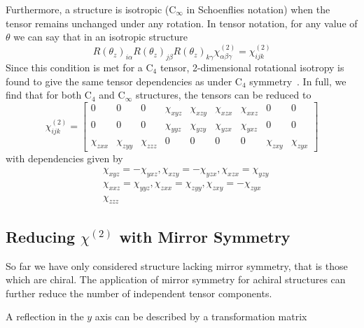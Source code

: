 Furthermore, a structure is isotropic (C$_{\infty}$ in Schoenflies notation) when the tensor remains unchanged under any rotation. In tensor notation, for any value of $\theta$ we can say that in an isotropic structure
\begin{equation}\label{eq:background:NonlinearOptics:rotation:RotIsoTensor}
	R(\theta_{z})_{i\alpha}R(\theta_{z})_{j\beta}R(\theta_{z})_{k\gamma}\chi^{(2)}_{\alpha \beta \gamma}
	=\chi^{(2)}_{ijk}
\end{equation}
Since this condition is met for a  C$_4$ tensor, 2-dimensional rotational isotropy is found to give the same tensor dependencies as under C$_4$ symmetry~\cite[\S E.1.8]{Popov1995}. In full, we find that for both C$_4$ and C$_{\infty}$ structures, the tensors can be reduced to
\begin{equation}\label{eq:background:NonlinearOptics:rotation:IsotropicChi}
	\chi^{(2)}_{ijk} =
	\begin{bmatrix}
		0 & 0 & 0 & \chi_{xyz} & \chi_{xzy} & \chi_{xzx} & \chi_{xxz} & 0 & 0\\ 
		0 & 0 & 0 & \chi_{yyz} & \chi_{yzy} & \chi_{yzx} & \chi_{yxz} & 0 & 0\\ 
		\chi_{zxx} & \chi_{zyy} & \chi_{zzz} & 0 & 0 & 0 & 0 & \chi_{zxy} & \chi_{zyx}
	\end{bmatrix}
\end{equation}
with dependencies given by
\begin{equation}\label{eq:background:NonlinearOptics:rotation:IsotropicDependancies}
\begin{split}
	&\chi_{xyz} = -\chi_{yxz}, \chi_{xzy} = -\chi_{yzx}, \chi_{xzx} = \chi_{yzy} \\
	&\chi_{xxz} = \chi_{yyz}, \chi_{zxx} = \chi_{zyy}, \chi_{zxy} = -\chi_{zyx} \\
	&\chi_{zzz}
\end{split}
\end{equation}



\subsection{Reducing \texorpdfstring{$\chi^{(2)}$}{Lg} with Mirror Symmetry}\label{sec:background:NonlinearOptics:mirror}
So far we have only considered structure lacking mirror symmetry, that is those which are chiral. The application of mirror symmetry for achiral structures can further reduce the number of independent tensor components.

A reflection in the $y$ axis can be described by a transformation matrix

